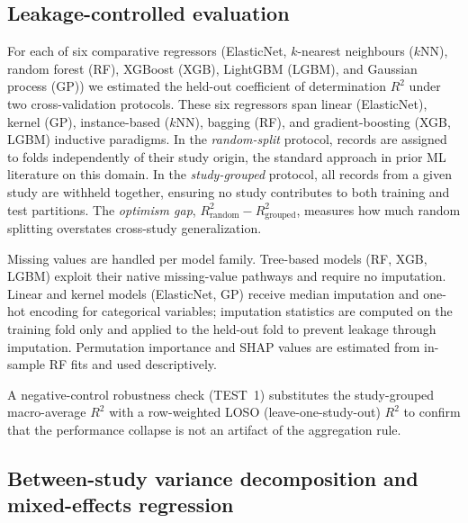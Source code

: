 \subsection{Leakage-controlled evaluation}

For each of six comparative regressors (ElasticNet, $k$-nearest neighbours ($k$NN),
random forest (RF), XGBoost (XGB), LightGBM (LGBM), and Gaussian process (GP)) we
estimated the held-out coefficient of determination $R^2$ under two cross-validation
protocols. These six regressors span linear (ElasticNet), kernel (GP), instance-based
($k$NN), bagging (RF), and gradient-boosting (XGB, LGBM) inductive paradigms.
In the \emph{random-split} protocol, records are assigned to folds
independently of their study origin, the standard approach in prior ML literature on
this domain. In the \emph{study-grouped} protocol, all records from a given study are
withheld together, ensuring no study contributes to both training and test partitions.
The \emph{optimism gap}, $R^2_{\text{random}} - R^2_{\text{grouped}}$, measures how
much random splitting overstates cross-study generalization.

Missing values are handled per model family. Tree-based models (RF, XGB, LGBM) exploit
their native missing-value pathways and require no imputation. Linear and kernel models
(ElasticNet, GP) receive median imputation and one-hot encoding for categorical
variables; imputation statistics are computed on the training fold only and applied to
the held-out fold to prevent leakage through imputation. Permutation importance and
SHAP values are estimated from in-sample RF fits and used descriptively.

A negative-control robustness check (TEST~1) substitutes the study-grouped
macro-average $R^2$ with a row-weighted LOSO (leave-one-study-out) $R^2$ to confirm
that the performance collapse is not an artifact of the aggregation rule.

\subsection{Between-study variance decomposition and mixed-effects regression}
\label{sec:variance_decomp}


